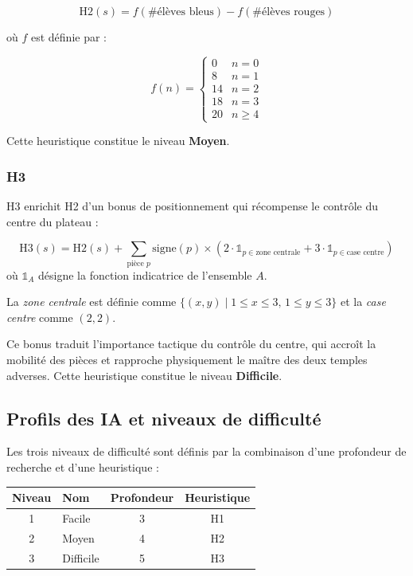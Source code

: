 \documentclass[12pt, a4paper]{article}
\begin{document}
\begin{equation}
  \text{H2}(s) = f(\#\text{élèves bleus}) - f(\#\text{élèves rouges})
\end{equation}

où $f$ est définie par :

\begin{equation}
  f(n) = \begin{cases}
    0  & n = 0 \\
    8  & n = 1 \\
    14 & n = 2 \\
    18 & n = 3 \\
    20 & n \geq 4
  \end{cases}
\end{equation}

Cette heuristique constitue le niveau \textbf{Moyen}.

\subsubsection{H3}

H3 enrichit H2 d'un bonus de positionnement qui récompense le contrôle du centre du plateau :

\begin{equation}
  \text{H3}(s) = \text{H2}(s)
    + \sum_{\text{pièce } p} \text{signe}(p) \times \left(2 \cdot \mathbb{1}_{p \in \text{zone centrale}} + 3 \cdot \mathbb{1}_{p \in \text{case centre}}\right)
\end{equation}
où $\mathbb{1}_A$ désigne la fonction indicatrice de l'ensemble $A$.

La \textit{zone centrale} est définie comme $\{(x,y) \mid 1 \leq x \leq 3,\, 1 \leq y \leq 3\}$
et la \textit{case centre} comme $(2,2)$.

Ce bonus traduit l'importance tactique du contrôle du centre, qui accroît la mobilité des
pièces et rapproche physiquement le maître des deux temples adverses. Cette heuristique
constitue le niveau \textbf{Difficile}.

\subsection{Profils des IA et niveaux de difficulté}

Les trois niveaux de difficulté sont définis par la combinaison d'une profondeur de recherche
et d'une heuristique :

\begin{center}
\begin{tabular}{clcc}
  \toprule
  Niveau & Nom & Profondeur & Heuristique \\
  \midrule
  1 & Facile   & 3 & H1 \\
  2 & Moyen    & 4 & H2 \\
  3 & Difficile & 5 & H3 \\
  \bottomrule
\end{tabular}
\end{center}
\end{document}
